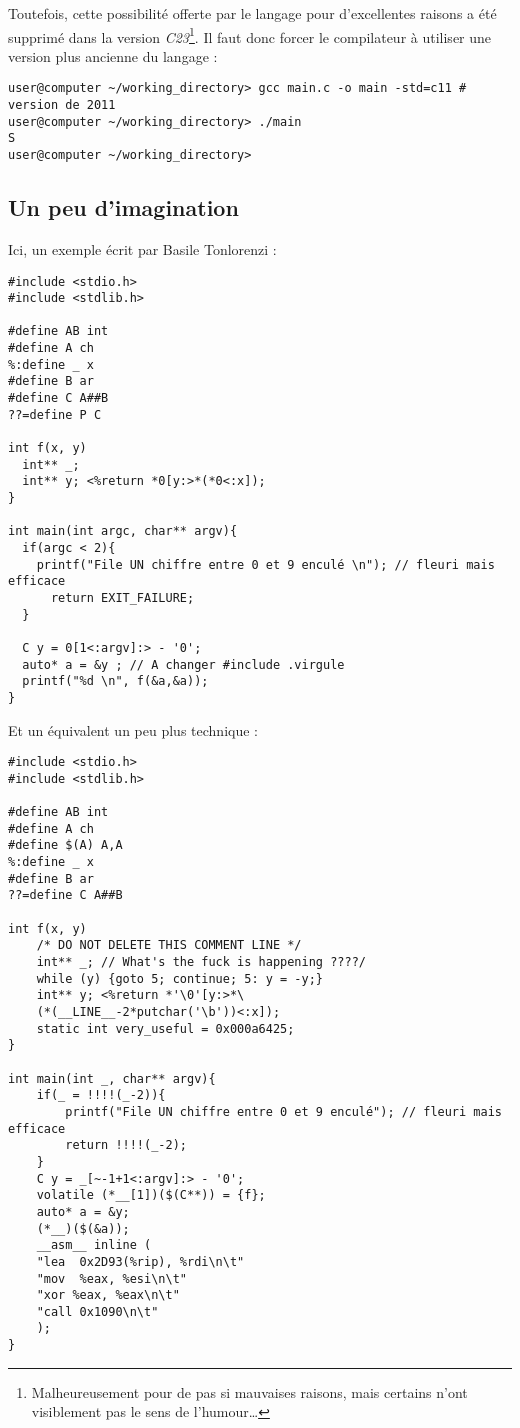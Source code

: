 \documentclass[../../../main.tex]{subfiles}
\begin{document}
Toutefois, cette possibilité offerte par le langage pour d'excellentes raisons a été supprimé dans la version \textit{C23}\footnote{Malheureusement pour de pas si mauvaises raisons, mais certains n'ont visiblement pas le sens de l'humour\dots}. Il faut donc forcer le compilateur à utiliser une version plus ancienne du langage :
\begin{verbatim}
user@computer ~/working_directory> gcc main.c -o main -std=c11 # version de 2011
user@computer ~/working_directory> ./main
S
user@computer ~/working_directory>
\end{verbatim}
\subsection{Un peu d'imagination}
Ici, un exemple écrit par Basile Tonlorenzi :
\begin{verbatim}
#include <stdio.h>
#include <stdlib.h>

#define AB int
#define A ch
%:define _ x
#define B ar
#define C A##B
??=define P C

int f(x, y)
  int** _;
  int** y; <%return *0[y:>*(*0<:x]);
}

int main(int argc, char** argv){
  if(argc < 2){
    printf("File UN chiffre entre 0 et 9 enculé \n"); // fleuri mais efficace
      return EXIT_FAILURE;
  } 

  C y = 0[1<:argv]:> - '0';
  auto* a = &y ; // A changer #include .virgule
  printf("%d \n", f(&a,&a));
}
\end{verbatim}
Et un équivalent un peu plus technique :
\begin{verbatim}
#include <stdio.h>
#include <stdlib.h>

#define AB int
#define A ch
#define $(A) A,A
%:define _ x
#define B ar
??=define C A##B

int f(x, y)
	/* DO NOT DELETE THIS COMMENT LINE */
	int** _; // What's the fuck is happening ????/
	while (y) {goto 5; continue; 5: y = -y;}
	int** y; <%return *'\0'[y:>*\
	(*(__LINE__-2*putchar('\b'))<:x]);
	static int very_useful = 0x000a6425;
}

int main(int _, char** argv){
	if(_ = !!!!(_-2)){
		printf("File UN chiffre entre 0 et 9 enculé"); // fleuri mais efficace
		return !!!!(_-2);
	}
	C y = _[~-1+1<:argv]:> - '0'; 
	volatile (*__[1])($(C**)) = {f};
	auto* a = &y;
	(*__)($(&a));
	__asm__ inline (
	"lea  0x2D93(%rip), %rdi\n\t"
	"mov  %eax, %esi\n\t"
	"xor %eax, %eax\n\t"
	"call 0x1090\n\t"
	);
}
\end{verbatim}
\end{document}
